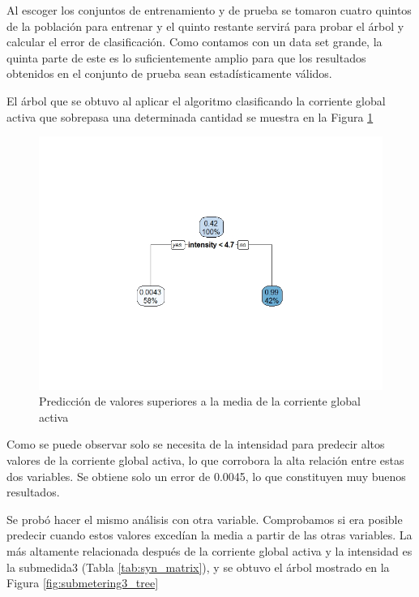 \documentclass[a4paper,10pt,twocolumn]{report}
\begin{document}
	Al escoger los conjuntos de entrenamiento y de prueba se tomaron cuatro quintos de la población para entrenar y el quinto restante servirá para probar el árbol y calcular el error de clasificación. Como contamos con un data set grande, la quinta parte de este es lo suficientemente amplio para que los resultados obtenidos en el conjunto de prueba sean estadísticamente válidos.
	
	El árbol que se obtuvo al aplicar el algoritmo clasificando la corriente global activa que sobrepasa una determinada cantidad se muestra en la Figura \ref{fig:gap_tree}
	
	\begin{figure}[H]
	\centering
	\includegraphics[width=\linewidth]{img/tree/gap_tree}
	\caption{Predicción de valores superiores a la media de la corriente global activa}
	\label{fig:gap_tree}
	\end{figure}
	
	Como se puede observar solo se necesita de la intensidad para predecir altos valores de la corriente global activa, lo que corrobora la alta relación entre estas dos variables. Se obtiene solo un error de 0.0045, lo que constituyen muy buenos resultados.
	
	Se probó hacer el mismo análisis con otra variable. Comprobamos si era posible predecir cuando estos valores excedían la media a partir de las otras variables. La más altamente relacionada después de la corriente global activa y la intensidad es la submedida3 (Tabla \ref{tab:syn_matrix}), y se obtuvo el árbol mostrado en la Figura \ref{fig:submetering3_tree}
	
\end{document}

